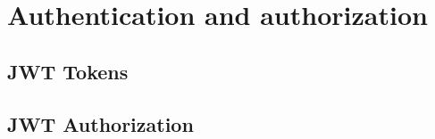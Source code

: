 \chapter{Authentication and authorization}\label{ch:authentication-and-authorization}




\section{JWT Tokens}\label{sec:jwt-tokens}


\section{JWT Authorization}\label{sec:jwt-authentication}
